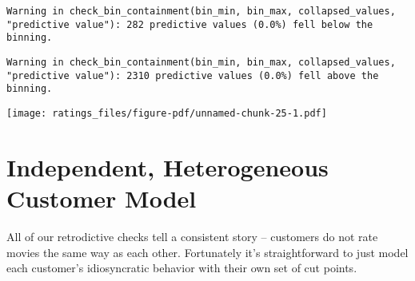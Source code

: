\documentclass[
  letterpaper,
  DIV=11,
  numbers=noendperiod]{scrartcl}
\begin{document}
\begin{verbatim}
Warning in check_bin_containment(bin_min, bin_max, collapsed_values,
"predictive value"): 282 predictive values (0.0%) fell below the binning.
\end{verbatim}

\begin{verbatim}
Warning in check_bin_containment(bin_min, bin_max, collapsed_values,
"predictive value"): 2310 predictive values (0.0%) fell above the binning.
\end{verbatim}

\texttt{[image: ratings\_files/figure-pdf/unnamed-chunk-25-1.pdf]}

\section{Independent, Heterogeneous Customer
Model}\label{independent-heterogeneous-customer-model}

All of our retrodictive checks tell a consistent story -- customers do
not rate movies the same way as each other. Fortunately it's
straightforward to just model each customer's idiosyncratic behavior
with their own set of cut points.
\end{document}
